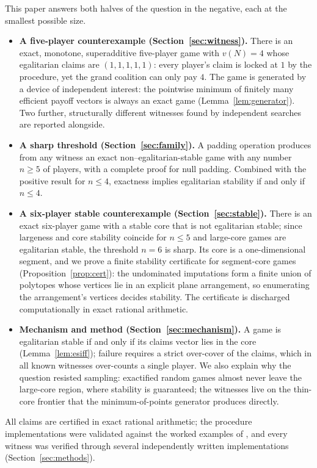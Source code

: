 \documentclass[11pt]{article}
\begin{document}
This paper answers both halves of the question in the negative, each at the
smallest possible size.

\begin{itemize}[leftmargin=2em]
\item \textbf{A five-player counterexample (Section~\ref{sec:witness}).}
There is an exact, monotone, superadditive five-player game with
$v(N)=4$ whose egalitarian claims are $(1,1,1,1,1)$: every player's claim is
locked at $1$ by the procedure, yet the grand coalition can only pay $4$.
The game is generated by a device of independent interest: the pointwise
minimum of finitely many efficient payoff vectors is always an exact game
(Lemma~\ref{lem:generator}). Two further, structurally different witnesses
found by independent searches are reported alongside.
\item \textbf{A sharp threshold (Section~\ref{sec:family}).} A padding
operation produces from any witness an exact non--egalitarian-stable game
with any number $n\ge5$ of players, with a complete proof for null padding.
Combined with the positive result for $n\le4$, exactness implies egalitarian
stability if and only if $n\le 4$.
\item \textbf{A six-player stable counterexample
(Section~\ref{sec:stable}).} There is an exact six-player game with a stable
core that is not egalitarian stable; since largeness and core stability
coincide for $n\le5$ \citep{Estevez2012} and large-core games are egalitarian
stable, the threshold $n=6$ is sharp. Its core is a one-dimensional segment,
and we prove a finite stability certificate for segment-core games
(Proposition~\ref{prop:cert}): the undominated imputations form a finite union
of polytopes whose vertices lie in an explicit plane arrangement, so
enumerating the arrangement's vertices decides stability. The certificate is
discharged computationally in exact rational arithmetic.
\item \textbf{Mechanism and method (Section~\ref{sec:mechanism}).} A game is
egalitarian stable if and only if its claims vector lies in the core
(Lemma~\ref{lem:esiff}); failure requires a strict over-cover of the claims,
which in all known witnesses over-counts a single player. We also explain
why the question resisted sampling: exactified random games almost never
leave the large-core region, where stability is guaranteed; the witnesses
live on the thin-core frontier that the minimum-of-points generator
produces directly.
\end{itemize}

All claims are certified in exact rational arithmetic; the procedure
implementations were validated against the worked examples of
\citet{Dietzenbacher2021}, and every witness was verified through several
independently written implementations
(Section~\ref{sec:methods}).
\end{document}
